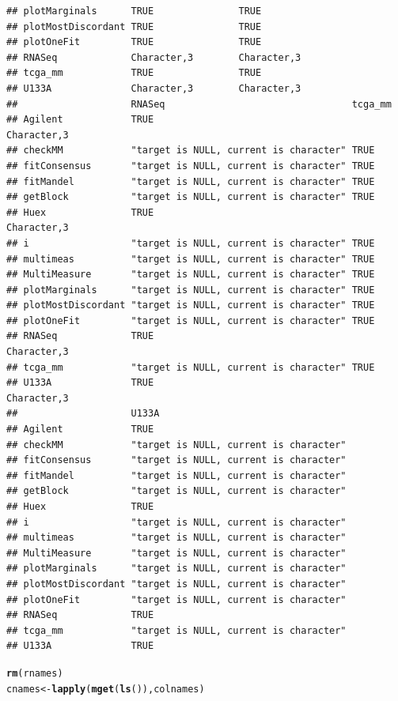 \documentclass{article}\usepackage[]{graphicx}\usepackage[]{color}
\makeatletter
\newcommand{\hlstd}[1]{\textcolor[rgb]{0.345,0.345,0.345}{#1}}%
\newcommand{\hlkwb}[1]{\textcolor[rgb]{0.69,0.353,0.396}{#1}}%
\newcommand{\hlkwd}[1]{\textcolor[rgb]{0.737,0.353,0.396}{\textbf{#1}}}%
\newenvironment{kframe}{%
 \def\at@end@of@kframe{}%
 \ifinner\ifhmode%
  \def\at@end@of@kframe{\end{minipage}}%
  \begin{minipage}{\columnwidth}%
 \fi\fi%
 \def\FrameCommand##1{\hskip\@totalleftmargin \hskip-\fboxsep
 \colorbox{shadecolor}{##1}\hskip-\fboxsep
     \hskip-\linewidth \hskip-\@totalleftmargin \hskip\columnwidth}%
 \MakeFramed {\advance\hsize-\width
   \@totalleftmargin\z@ \linewidth\hsize
   \@setminipage}}%
 {\par\unskip\endMakeFramed%
 \at@end@of@kframe}
\newenvironment{knitrout}{}{} %
\makeatother
\begin{document}
\begin{knitrout}
\begin{kframe}
\begin{verbatim}
## plotMarginals      TRUE               TRUE       
## plotMostDiscordant TRUE               TRUE       
## plotOneFit         TRUE               TRUE       
## RNASeq             Character,3        Character,3
## tcga_mm            TRUE               TRUE       
## U133A              Character,3        Character,3
##                    RNASeq                                 tcga_mm    
## Agilent            TRUE                                   Character,3
## checkMM            "target is NULL, current is character" TRUE       
## fitConsensus       "target is NULL, current is character" TRUE       
## fitMandel          "target is NULL, current is character" TRUE       
## getBlock           "target is NULL, current is character" TRUE       
## Huex               TRUE                                   Character,3
## i                  "target is NULL, current is character" TRUE       
## multimeas          "target is NULL, current is character" TRUE       
## MultiMeasure       "target is NULL, current is character" TRUE       
## plotMarginals      "target is NULL, current is character" TRUE       
## plotMostDiscordant "target is NULL, current is character" TRUE       
## plotOneFit         "target is NULL, current is character" TRUE       
## RNASeq             TRUE                                   Character,3
## tcga_mm            "target is NULL, current is character" TRUE       
## U133A              TRUE                                   Character,3
##                    U133A                                 
## Agilent            TRUE                                  
## checkMM            "target is NULL, current is character"
## fitConsensus       "target is NULL, current is character"
## fitMandel          "target is NULL, current is character"
## getBlock           "target is NULL, current is character"
## Huex               TRUE                                  
## i                  "target is NULL, current is character"
## multimeas          "target is NULL, current is character"
## MultiMeasure       "target is NULL, current is character"
## plotMarginals      "target is NULL, current is character"
## plotMostDiscordant "target is NULL, current is character"
## plotOneFit         "target is NULL, current is character"
## RNASeq             TRUE                                  
## tcga_mm            "target is NULL, current is character"
## U133A              TRUE
\end{verbatim}
\begin{alltt}
\hlkwd{rm}\hlstd{(rnames)}
\hlstd{cnames} \hlkwb{<-} \hlkwd{lapply}\hlstd{(}\hlkwd{mget}\hlstd{(}\hlkwd{ls}\hlstd{()), colnames)}

\end{alltt}
\end{kframe}
\end{knitrout}
\end{document}
